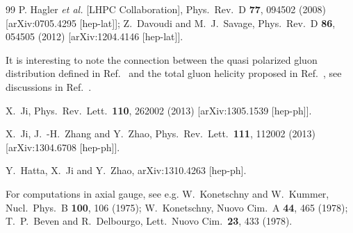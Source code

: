 \begin{thebibliography}{99}
  P. Hagler {\it et al.}  [LHPC Collaboration],
  Phys.\ Rev.\ D {\bf 77}, 094502 (2008)
  [arXiv:0705.4295 [hep-lat]];
  Z.~Davoudi and M.~J.~Savage,
  Phys.\ Rev.\ D {\bf 86}, 054505 (2012)
  [arXiv:1204.4146 [hep-lat]].


{It is interesting to note the connection between the quasi polarized gluon distribution defined in Ref.~\cite{Ji:2013dva} and the total gluon helicity proposed in Ref.~\cite{Ji:2013fga}, see discussions in Ref.~\cite{Hatta:2013gta}.}



  X.~Ji,
  Phys.\ Rev.\ Lett.\  {\bf 110}, 262002 (2013)
[arXiv:1305.1539 [hep-ph]].


  X.~Ji, J.~-H.~Zhang and Y.~Zhao,
  Phys.\ Rev.\ Lett.\  {\bf 111}, 112002 (2013)
  [arXiv:1304.6708 [hep-ph]].



  Y.~Hatta, X.~Ji and Y.~Zhao,
  arXiv:1310.4263 [hep-ph].


For computations in axial gauge, see e.g.
  W.~Konetschny and W.~Kummer,
  Nucl.\ Phys.\ B {\bf 100}, 106 (1975);
  W.~Konetschny,
  Nuovo Cim.\ A {\bf 44}, 465 (1978);
  T.~P.~Beven and R.~Delbourgo,
  Lett.\ Nuovo Cim.\  {\bf 23}, 433 (1978).




\end{thebibliography}
